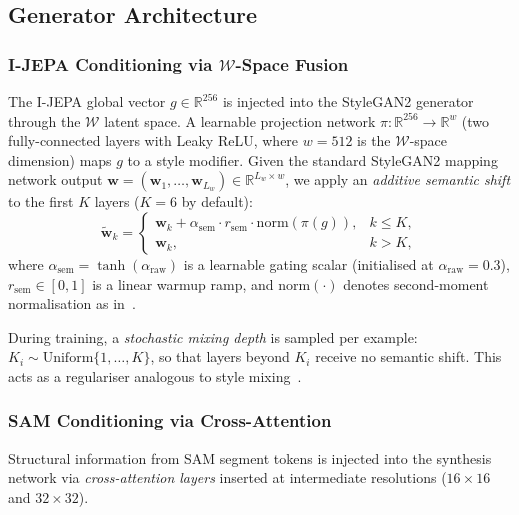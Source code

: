 \documentclass[12pt]{article}
\begin{document}
\subsection{Generator Architecture}

\subsubsection{I-JEPA Conditioning via $\mathcal{W}$-Space Fusion}

The I-JEPA global vector $g \in \mathbb{R}^{256}$ is injected into the
StyleGAN2 generator through the $\mathcal{W}$ latent space.
A learnable projection network
$\pi : \mathbb{R}^{256} \to \mathbb{R}^{w}$
(two fully-connected layers with Leaky ReLU, where $w = 512$ is the
$\mathcal{W}$-space dimension) maps $g$ to a style modifier.
Given the standard StyleGAN2 mapping network output
$\mathbf{w} = (\mathbf{w}_1, \ldots, \mathbf{w}_{L_w}) \in \mathbb{R}^{L_w \times w}$,
we apply an \emph{additive semantic shift} to the first $K$ layers
($K = 6$ by default):
\begin{equation}\label{eq:w-fusion}
    \tilde{\mathbf{w}}_k =
    \begin{cases}
    \mathbf{w}_k + \alpha_{\mathrm{sem}} \cdot r_{\mathrm{sem}}
    \cdot \mathrm{norm}(\pi(g)),
    & k \leq K, \\
    \mathbf{w}_k, & k > K,
    \end{cases}
\end{equation}
where $\alpha_{\mathrm{sem}} = \tanh(\alpha_{\mathrm{raw}})$ is a learnable
gating scalar (initialised at $\alpha_{\mathrm{raw}} = 0.3$),
$r_{\mathrm{sem}} \in [0,1]$ is a linear warmup ramp, and
$\mathrm{norm}(\cdot)$ denotes second-moment normalisation
as in~\cite{karras2020stylegan2}.

During training, a \emph{stochastic mixing depth} is sampled per
example: $K_i \sim \mathrm{Uniform}\{1,\ldots,K\}$, so that
layers beyond $K_i$ receive no semantic shift.
This acts as a regulariser analogous to style mixing~\cite{karras2019style}.

\subsubsection{SAM Conditioning via Cross-Attention}
\label{sec:cross-attn}

Structural information from SAM segment tokens is injected into the
synthesis network via \emph{cross-attention layers} inserted at
intermediate resolutions ($16 \times 16$ and $32 \times 32$).
\end{document}
